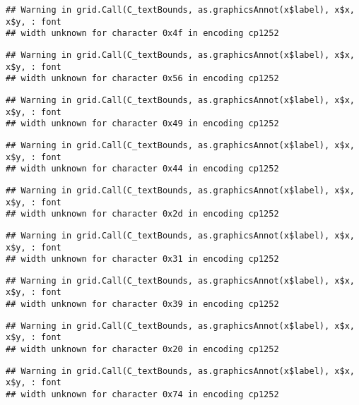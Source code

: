 \documentclass[
]{article}
\begin{document}
\begin{verbatim}
## Warning in grid.Call(C_textBounds, as.graphicsAnnot(x$label), x$x, x$y, : font
## width unknown for character 0x4f in encoding cp1252
\end{verbatim}

\begin{verbatim}
## Warning in grid.Call(C_textBounds, as.graphicsAnnot(x$label), x$x, x$y, : font
## width unknown for character 0x56 in encoding cp1252
\end{verbatim}

\begin{verbatim}
## Warning in grid.Call(C_textBounds, as.graphicsAnnot(x$label), x$x, x$y, : font
## width unknown for character 0x49 in encoding cp1252
\end{verbatim}

\begin{verbatim}
## Warning in grid.Call(C_textBounds, as.graphicsAnnot(x$label), x$x, x$y, : font
## width unknown for character 0x44 in encoding cp1252
\end{verbatim}

\begin{verbatim}
## Warning in grid.Call(C_textBounds, as.graphicsAnnot(x$label), x$x, x$y, : font
## width unknown for character 0x2d in encoding cp1252
\end{verbatim}

\begin{verbatim}
## Warning in grid.Call(C_textBounds, as.graphicsAnnot(x$label), x$x, x$y, : font
## width unknown for character 0x31 in encoding cp1252
\end{verbatim}

\begin{verbatim}
## Warning in grid.Call(C_textBounds, as.graphicsAnnot(x$label), x$x, x$y, : font
## width unknown for character 0x39 in encoding cp1252
\end{verbatim}

\begin{verbatim}
## Warning in grid.Call(C_textBounds, as.graphicsAnnot(x$label), x$x, x$y, : font
## width unknown for character 0x20 in encoding cp1252
\end{verbatim}

\begin{verbatim}
## Warning in grid.Call(C_textBounds, as.graphicsAnnot(x$label), x$x, x$y, : font
## width unknown for character 0x74 in encoding cp1252
\end{verbatim}
\end{document}
